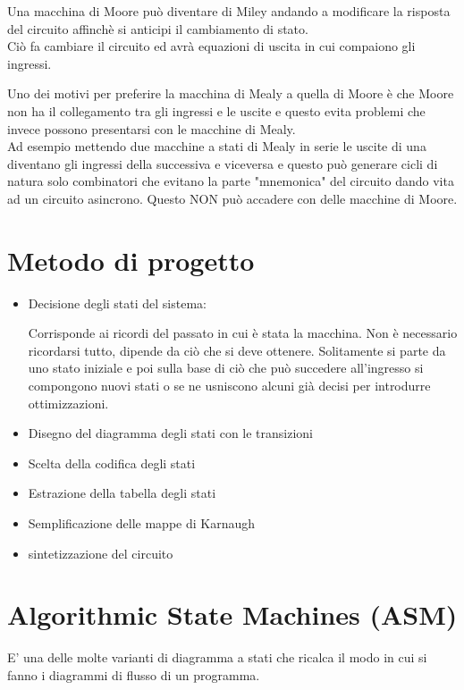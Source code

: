\documentclass[a4paper]{book}
\begin{document}
Una macchina di Moore può diventare di Miley andando a modificare la risposta del circuito affinchè si anticipi il cambiamento di stato.\\
Ciò fa cambiare il circuito ed avrà equazioni di uscita in cui compaiono gli ingressi.

Uno dei motivi per preferire la macchina di Mealy a quella di Moore è che Moore non ha il collegamento tra gli ingressi e le uscite e questo evita problemi che invece possono presentarsi con le macchine di Mealy.\\
Ad esempio mettendo due macchine a stati di Mealy in serie le uscite di una diventano gli ingressi della successiva e viceversa e questo può generare cicli di natura solo combinatori che evitano la parte "mnemonica" del circuito dando vita ad un circuito asincrono.
Questo NON può accadere con delle macchine di Moore.

\section{Metodo di progetto}

\begin{itemize}
\item Decisione degli stati del sistema:

Corrisponde ai ricordi del passato in cui è stata la macchina. Non è necessario ricordarsi tutto, dipende da ciò che si deve ottenere.
Solitamente si parte da uno stato iniziale e poi sulla base di ciò che può succedere all'ingresso si compongono nuovi stati o se ne usniscono alcuni già decisi per introdurre ottimizzazioni.


\item Disegno del diagramma degli stati con le transizioni
\item Scelta della codifica degli stati
\item Estrazione della tabella degli stati
\item Semplificazione delle mappe di Karnaugh
\item sintetizzazione del circuito

\end{itemize}

\section{Algorithmic State Machines (ASM)}

E' una delle molte varianti di diagramma a stati che ricalca il modo in cui si fanno i diagrammi di flusso di un programma.
\end{document}
